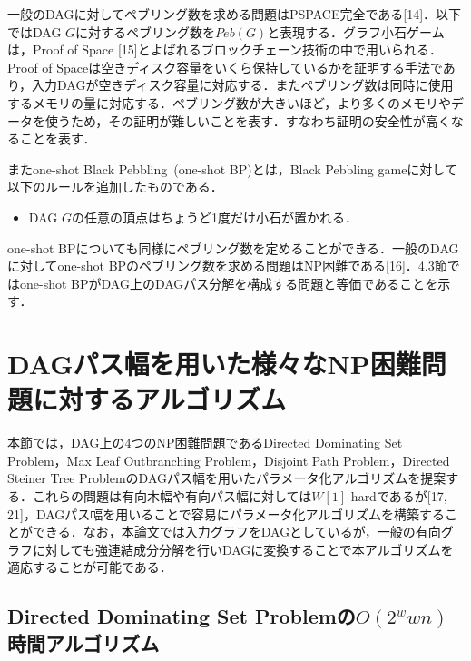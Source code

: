 \documentclass[master]{kuisthesis}		%
\theoremstyle{plain}
\theoremstyle{definition}
\begin{document}
一般のDAGに対してペブリング数を求める問題はPSPACE完全である[14]．以下ではDAG $G$に対するペブリング数を$Peb(G)$と表現する．グラフ小石ゲームは，Proof of Space [15]とよばれるブロックチェーン技術の中で用いられる．Proof of Spaceは空きディスク容量をいくら保持しているかを証明する手法であり，入力DAGが空きディスク容量に対応する．またペブリング数は同時に使用するメモリの量に対応する．ペブリング数が大きいほど，より多くのメモリやデータを使うため，その証明が難しいことを表す．すなわち証明の安全性が高くなることを表す．

またone-shot Black Pebbling\ (one-shot BP)とは，Black Pebbling gameに対して以下のルールを追加したものである．
\begin{itemize}
    \item DAG $G$の任意の頂点はちょうど1度だけ小石が置かれる．
\end{itemize}

one-shot BPについても同様にペブリング数を定めることができる．一般のDAGに対してone-shot BPのペブリング数を求める問題はNP困難である[16]．4.3節ではone-shot BPがDAG上のDAGパス分解を構成する問題と等価であることを示す．




















\section{DAGパス幅を用いた様々なNP困難問題に対するアルゴリズム} %
本節では，DAG上の4つのNP困難問題であるDirected Dominating Set Problem，Max Leaf Outbranching Problem，Disjoint Path Problem，Directed Steiner Tree ProblemのDAGパス幅を用いたパラメータ化アルゴリズムを提案する．これらの問題は有向木幅や有向パス幅に対しては$W[1]$-hardであるが[17, 21]，DAGパス幅を用いることで容易にパラメータ化アルゴリズムを構築することができる．なお，本論文では入力グラフをDAGとしているが，一般の有向グラフに対しても強連結成分分解を行いDAGに変換することで本アルゴリズムを適応することが可能である．










\subsection{Directed Dominating Set Problemの$O(2^wwn)$時間アルゴリズム}\label{3.1}
\end{document}
